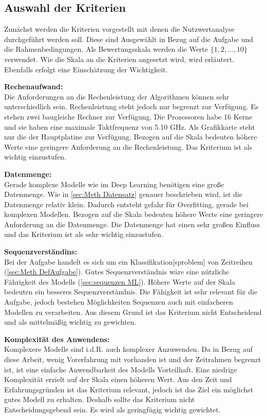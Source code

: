 \subsection{Auswahl der Kriterien}
Zunächst werden die Kriterien vorgestellt mit denen die Nutzwertanalyse durchgeführt werden soll. Diese sind Ausgewählt in Bezug auf die Aufgabe und die Rahmenbedingungen. Als Bewertungsskala werden die Werte \(\{1,2,\dots,10\}\) verwendet. Wie die Skala an die Kriterien angesetzt wird, wird erläutert. Ebenfalls erfolgt eine Einschätzung der Wichtigkeit.\par

\textbf{Rechenaufwand:}\\
Die Anforderungen an die Rechenleistung der Algorithmen können sehr unterschiedlich sein. Rechenleistung 
steht jedoch nur begrenzt zur Verfügung. Es stehen zwei baugleiche Rechner zur Verfügung. Die Prozessoren 
habe 16 Kerne und sie haben eine maximale Taktfrequenz von 5.10 GHz. Als Grafikkarte steht nur die der 
Hauptplatine zur Verfügung. Bezogen auf die Skala bedeuten höhere Werte eine geringere Anforderung an die Rechenleistung. Das Kriterium ist als wichtig einzustufen.\par

\textbf{Datenmenge:}\\
Gerade komplexe Modelle wie im \gls{Deep Learning} benötigen eine große Datenmenge. Wie in \ref{sec:Meth Datensatz} genauer beschrieben wird, ist die Datenmenge relativ klein. Dadurch entsteht gefahr für \gls{Overfitting}, gerade bei komplexen Modellen. Bezogen auf die Skala bedeuten höhere Werte eine geringere Anforderung an die Datenmenge. Die Datenmenge hat einen sehr großen Einfluss und das Kriterium ist als sehr wichtig einzustufen. \par

\textbf{Sequenzverständins:}\\
Bei der Aufgabe handelt es sich um ein \gls{Klassifikation}[sproblem] von Zeitreihen (\ref{sec:Meth DefAufgabe}). Gutes Sequenzverständnis wäre eine nützliche Fährigkeit des Modells (\ref{sec:sequenzen ML}). Höhere Werte auf der Skala bedeuten ein besseres Sequenzverständnis. Die Fähigkeit ist sehr relevant für die Aufgabe, jedoch bestehen Möglichkeiten Sequenzen auch mit einfacheren Modellen zu verarbeiten. Aus diesem Grund ist das Kriterium nicht Entscheidend und als mittelmäßig wichtig zu gewichten. \par

\textbf{Komplexität des Anwendens:}\\
Komplexere Modelle sind i.d.R. auch komplexer Anzuwenden. Da in Bezug auf diese Arbeit, wenig Vorerfahrung mit  vorhanden ist und der Zeitrahmen begrenzt ist, ist eine einfache Anwendbarkeit des Modells Vorteilhaft. Eine niedrige Komplexität erzielt auf der Skala einen höheren Wert. Aus den Zeit und Erfahrungsgründen ist das Kriterium relevant, jedoch ist das Ziel ein möglichst gutes Modell zu erhalten. Deshalb sollte das Kriterium nicht Entscheidungsgebend sein. Es wird als geringfügig wichtig gewichtet. \par

